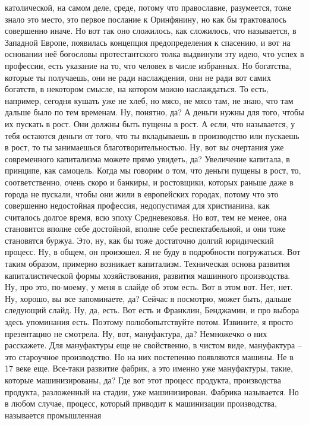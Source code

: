 католической, на самом деле, среде, потому что православие, разумеется, тоже
знало это место, это первое послание к Оринфянину, но как бы трактовалось
совершенно иначе. Но вот так оно сложилось, как сложилось, что называется, в
Западной Европе, появилась концепция предопределения к спасению, и вот на
основании неё богословы протестантского толка выдвинули эту идею, что успех в
профессии, есть указание на то, что человек в числе избранных. Но богатства,
которые ты получаешь, они не ради наслаждения, они не ради вот самих богатств, в
некотором смысле, на котором можно наслаждаться. То есть, например, сегодня
кушать уже не хлеб, но мясо, не мясо там, не знаю, что там дальше было по тем
временам. Ну, понятно, да? А деньги нужны для того, чтобы их пускать в рост. Они
должны быть пущены в рост. А если, что называется, у тебя остаются деньги от
того, что ты вкладываешь в производство или пускаешь в рост, то ты занимаешься
благотворительностью. Ну, вот вы очертания уже современного капитализма можете
прямо увидеть, да? Увеличение капитала, в принципе, как самоцель. Когда мы
говорим о том, что деньги пущены в рост, то, соответственно, очень скоро и
банкиры, и ростовщики, которых раньше даже в города не пускали, чтобы они жили в
европейских городах, потому что это совершенно недостойная профессия,
недопустимая для христианина, как считалось долгое время, всю эпоху
Средневековья. Но вот, тем не менее, она становится вполне себе достойной,
вполне себе респектабельной, и они тоже становятся буржуа. Это, ну, как бы тоже
достаточно долгий юридический процесс. Ну, в общем, он произошел. Я не буду в
подробности погружаться. Вот таким образом, примерно возникает капитализм.
Техническая основа развития капиталистической формы хозяйствования, развития
машинного производства. Ну, про это, по-моему, у меня в слайде об этом есть. Вот
в этом вот. Нет, нет. Ну, хорошо, вы все запоминаете, да? Сейчас я посмотрю,
может быть, дальше следующий слайд. Ну, да, есть. Вот есть и Франклин,
Бенджамин, и про выбора здесь упоминания есть. Поэтому полюбопытствуйте потом.
Извините, я просто презентацию не смотрела. Ну, вот, мануфактура, да? Немножечко
о них расскажете. Для мануфактуры еще не свойственно, в чистом виде, мануфактура
– это староучное производство. Но на них постепенно появляются машины. Не в 17
веке еще. Все-таки развитие фабрик, а это именно уже мануфактуры, такие, которые
машинизированы, да? Где вот этот процесс продукта, производства продукта,
разложенный на стадии, уже машинизирован. Фабрика называется. Но в любом случае,
процесс, который приводит к машинизации производства, называется промышленная
